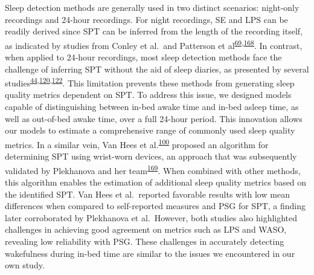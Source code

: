 \documentclass[
  10pt,
]{scrbook}
\begin{document}
Sleep detection methods are generally used in two distinct scenarios:
night-only recordings and 24-hour recordings. For night recordings, SE
and LPS can be readily derived since SPT can be inferred from the length
of the recording itself, as indicated by studies from Conley et al.~and
Patterson et
al\textsuperscript{\protect\hyperlink{ref-conley_agreement_2019}{69},\protect\hyperlink{ref-patterson_40_2023}{168}}.
In contrast, when applied to 24-hour recordings, most sleep detection
methods face the challenge of inferring SPT without the aid of sleep
diaries, as presented by several
studies\textsuperscript{\protect\hyperlink{ref-girschik_validation_2012}{44},\protect\hyperlink{ref-doherty_large_2017}{120},\protect\hyperlink{ref-anderson_assessment_2014}{122}}.
This limitation prevents these methods from generating sleep quality
metrics dependent on SPT. To address this issue, we designed models
capable of distinguishing between in-bed awake time and in-bed asleep
time, as well as out-of-bed awake time, over a full 24-hour period. This
innovation allows our models to estimate a comprehensive range of
commonly used sleep quality metrics. In a similar vein, Van Hees et
al.\textsuperscript{\protect\hyperlink{ref-van_hees_estimating_2018}{100}}
proposed an algorithm for determining SPT using wrist-worn devices, an
approach that was subsequently validated by Plekhanova and her
team\textsuperscript{\protect\hyperlink{ref-plekhanova_validation_2023}{169}}.
When combined with other methods, this algorithm enables the estimation
of additional sleep quality metrics based on the identified SPT. Van
Hees et al.~reported favorable results with low mean differences when
compared to self-reported measures and PSG for SPT, a finding later
corroborated by Plekhanova et al.~However, both studies also highlighted
challenges in achieving good agreement on metrics such as LPS and WASO,
revealing low reliability with PSG. These challenges in accurately
detecting wakefulness during in-bed time are similar to the issues we
encountered in our own study.
\end{document}
